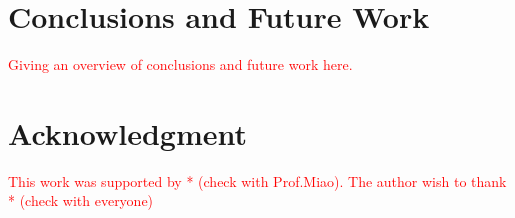 \documentclass[conference]{IEEEtran}
\begin{document}















\section{Conclusions and Future Work}

\textcolor{red}{
	Giving an overview of conclusions and future work here.
}


\section*{Acknowledgment}

\textcolor{red}{
This work was supported by * (check with Prof.Miao). 
The author wish to thank * (check with everyone)
}




\end{document}
